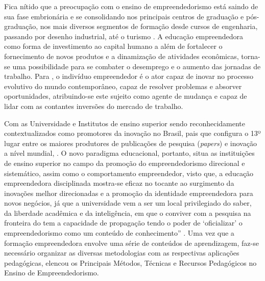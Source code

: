\clearpage
Fica nítido que a preocupação com o ensino de empreendedorismo está saindo de sua fase embrionária e se consolidando nos principais centros de graduação e pós-graduação, nos mais diversos segmentos de formação desde cursos de engenharia, passando por desenho industrial, até o turismo \cite{henrique_praticas_2008}. A educação empreendedora como forma de investimento ao capital humano a além de fortalecer o fornecimento de novos produtos e a dinamização de atividades  econômicas, torna-se uma possibilidade para se combater o desemprego \cite{morais_empreendedorismo_2018} e o aumento das jornadas de trabalho. Para , o indivíduo empreendedor é o ator capaz de inovar no processo evolutivo do mundo contemporâneo, capaz de resolver problemas e absorver oportunidades, atribuindo-se este sujeito como agente de mudança e capaz de lidar com as contantes inversões do mercado de trabalho. 

Com as Universidade e Institutos de ensino superior sendo reconhecidamente contextualizados como promotores da inovação no  Brasil, pais que configura o 13º lugar entre os maiores produtores de publicações de pesquisa (\textit{papers}) e inovação a nível mundial, .  O novo paradigma educacional, portanto, situa as instituições de ensino superior no campo da promoção do empreendedorismo direcional e sistemático, assim como o comportamento empreendedor, visto que, a educação empreendedora disciplinada mostra-se eficaz no tocante ao surgimento da inovações melhor direcionadas e a promoção da identidade empreendedora para novos negócios, \cite{jain_academics_2009} já que a universidade vem a ser um local privilegiado do saber, da liberdade acadêmica e da inteligência, em que o conviver com a pesquisa na fronteira do tem a capacidade de propagação tendo o poder de ‘oficializar’ o empreendedorismo como um conteúdo de conhecimento” \cite{dolabela_oficina_2008}. Uma vez que a formação empreendedora envolve uma série de conteúdos de aprendizagem, faz-se necessário organizar as diversas metodologias com as respectivas aplicações pedagógicas, \cite{rocha_avaliacao_2014} elencou os Principais Métodos, Técnicas e Recursos Pedagógicos no Ensino de Empreendedorismo. 



